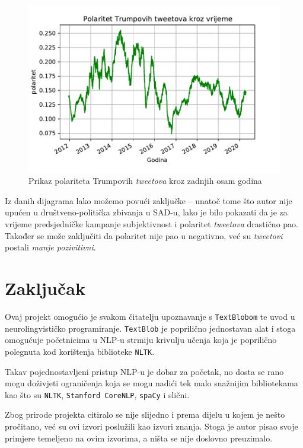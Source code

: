 \documentclass[10pt]{foi}
\begin{document}
\begin{figure}
	\includegraphics{"slike/polaritet.pdf"}
	\caption{Prikaz polariteta Trumpovih \textit{tweetova} kroz zadnjih
	osam godina}
\end{figure}

Iz danih dijagrama lako možemo povući zaključke -- unatoč tome što autor nije
upućen u društveno-politička zbivanja u SAD-u, lako je bilo pokazati da je za
vrijeme predsjedničke kampanje subjektivnost i polaritet \textit{tweetova}
drastično pao. Također se može zaključiti da polaritet nije pao u negativno,
već su \textit{tweetovi} postali \textit{manje pozivitivni}.

\chapter{Zaključak}

Ovaj projekt omogućio je svakom čitatelju upoznavanje s \texttt{TextBlobom} te
uvod u neurolingvističko programiranje. \texttt{TextBlob} je poprilično
jednostavan alat i stoga omogućuje početnicima u NLP-u strmiju krivulju učenja
koja je poprilično polegnuta kod korištenja biblioteke \texttt{NLTK}.

Takav pojednostavljeni pristup NLP-u je dobar za početak, no dosta se rano mogu
doživjeti ograničenja koja se mogu nadići tek malo snažnijim bibliotekama kao
što su \texttt{NLTK}, \texttt{Stanford CoreNLP}, \texttt{spaCy} i slični.

\nocite{*}



Zbog prirode projekta citiralo se nije slijedno i prema dijelu u kojem je
nešto pročitano, već su ovi izvori poslužili kao izvori znanja. Stoga je autor
pisao svoje primjere temeljeno na ovim izvorima, a ništa se nije doslovno
preuzimalo.
\end{document}
